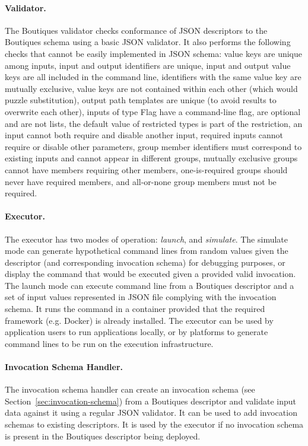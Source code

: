 \documentclass{article}
\newcommand{\boutiques}{Boutiques\xspace}
\begin{document}
\paragraph{Validator.} The \boutiques validator checks conformance of JSON
descriptors to the \boutiques schema using a basic JSON validator. It
also performs the following checks that cannot be easily implemented
in JSON schema: value keys are unique among inputs, input and output
identifiers are unique, input and output value keys are all included
in the command line, identifiers with the same value key are mutually
exclusive, value keys are not contained within each other (which would
puzzle substitution), output path templates are unique (to avoid
results to overwrite each other), inputs of type Flag have a
command-line flag, are optional and are not lists, the default value
of restricted types is part of the restriction, an input cannot both
require and disable another input, required inputs cannot require or
disable other parameters, group member identifiers must correspond to
existing inputs and cannot appear in different groups, mutually
exclusive groups cannot have members requiring other members,
one-is-required groups should never have required members, and
all-or-none group members must not be required.


\paragraph{Executor.} The executor has two modes of operation: \emph{launch}, and
\emph{simulate}. The simulate mode can generate hypothetical command lines from
random values given the descriptor (and corresponding invocation schema) for debugging
purposes, or display the command that would be executed given a provided valid
invocation. The launch mode can execute command line from a \boutiques descriptor and
a set of input values represented in JSON file complying with the invocation schema.
It runs the command in a container provided that the required framework (e.g. Docker)
is already installed. The executor can be used by application users to run
applications locally, or by platforms to generate command lines to be run on the
execution infrastructure.

\paragraph{Invocation Schema Handler.} The invocation schema handler can create an
invocation schema (see Section~\ref{sec:invocation-schema}) from a \boutiques descriptor
and validate input data against it using a regular JSON validator. It can be used to add
invocation schemas to existing descriptors. It is used by the executor if no invocation
schema is present in the \boutiques descriptor being deployed.
\end{document}

